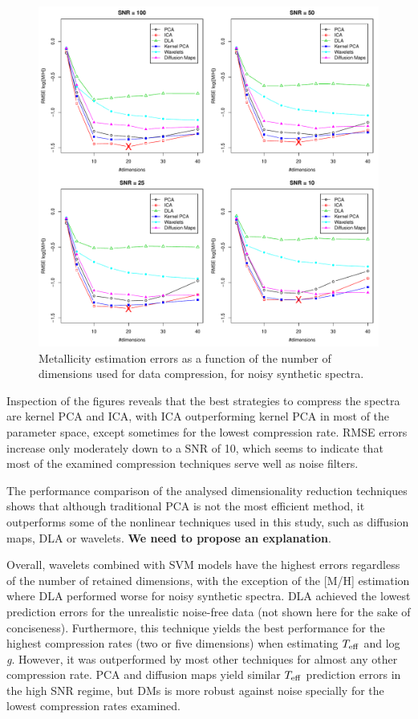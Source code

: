 \documentclass[a4paper,fleqn,usenatbib]{mnras}
\begin{document}
{{{\begin{figure}[ht]
\centering\includegraphics[width=\textwidth]{flamesHR10_Meta_log_BestSVM_N-RMSE_test.pdf}
\caption{Metallicity estimation errors as a function of the number of
  dimensions used for data compression, for noisy synthetic
  spectra.}
\label{fig:06}
\end{figure}

Inspection of the figures reveals that the best strategies to compress
the spectra are kernel PCA and ICA, with ICA outperforming kernel PCA
in most of the parameter space, except sometimes for the lowest
compression rate. RMSE errors increase only moderately down to a SNR
of 10, which seems to indicate that most of the examined compression
techniques serve well as noise filters.

The performance comparison of the analysed dimensionality reduction
techniques shows that although traditional PCA is not the most
efficient method, it outperforms some of the nonlinear techniques used
in this study, such as diffusion maps, DLA or wavelets. {\bf We need
  to propose an explanation}. 

Overall, wavelets combined with SVM models have the highest errors
regardless of the number of retained dimensions, with the exception of
the [M/H] estimation where DLA performed worse for noisy synthetic
spectra. DLA achieved the lowest prediction errors for the unrealistic
noise-free data (not shown here for the sake of
conciseness). Furthermore, this technique yields the best performance
for the highest compression rates (two or five dimensions) when
estimating $T_{\rm eff}$ and log \textit{g}. However, it was
outperformed by most other techniques for almost any other compression
rate. PCA and diffusion maps yield similar $T_{\rm eff}$ prediction
errors in the high SNR regime, but DMs is more robust against noise
specially for the lowest compression rates examined.

}}}
\end{document}
